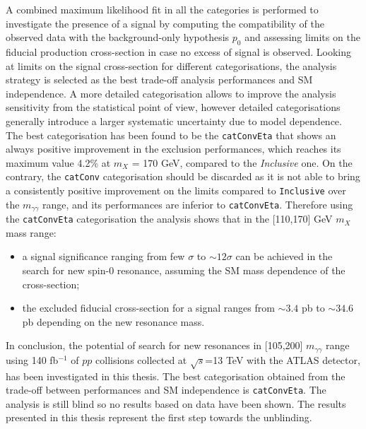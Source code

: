 \documentclass[a4paper, oneside, 11pt, openright]{book}
\begin{document}
		A combined maximum likelihood fit in all the categories is performed to investigate the presence of a signal by computing the compatibility of the observed data with the background-only hypothesis $p_0$ \cite{Statistic} and assessing limits \cite{Statistic} on the fiducial production cross-section in case no excess of signal is observed. Looking at limits on the signal cross-section for different categorisations, the analysis strategy is selected as the best trade-off analysis performances and SM independence. A more detailed categorisation allows to improve the analysis sensitivity from the statistical point of view, however detailed categorisations generally introduce a larger systematic uncertainty due to model dependence. The best categorisation has been found to be the \texttt{catConvEta} that shows an always positive improvement in the exclusion performances, which reaches its maximum value 4.2\% at $m_X$ = 170 GeV, compared to the \textit{Inclusive} one. On the contrary, the \texttt{catConv} categorisation should be discarded as it is not able to bring a consistently positive improvement on the limits compared to \texttt{Inclusive} over the $m_{\gamma\gamma}$ range, and its performances are inferior to \texttt{catConvEta}. Therefore using the \texttt{catConvEta} categorisation the analysis shows that in the [110,170] GeV $m_X$ mass range:
		\begin{itemize}
			\item a signal significance ranging from few $\sigma$ to $\sim12\sigma$ can be achieved in the search for new spin-0 resonance, assuming the SM mass dependence of the cross-section;
			\item the excluded fiducial cross-section for a signal ranges from $\sim 3.4$ pb to $\sim 34.6$ pb depending on the new resonance mass.
		\end{itemize}
		
		In conclusion, the potential of search for new resonances in [105,200] $m_{\gamma\gamma}$ range using 140 fb$^{-1}$ of $pp$ collisions collected at $\sqrt{s}$=13 TeV with the ATLAS detector, has been investigated in this thesis. The best categorisation obtained from the trade-off between performances and SM independence is \texttt{catConvEta}. The analysis is still blind so no results based on data have been shown. The results presented in this thesis represent the first step towards the unblinding.
		
		
		
 			
\end{document}
